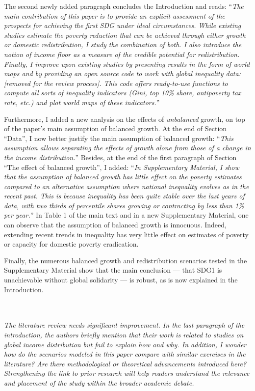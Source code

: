 \documentclass[12pt,english]{article}
\begin{document}
The second newly added paragraph concludes the Introduction and reads: ``\textit{The main contribution of this paper is to provide an explicit assessment of the prospects for achieving the first SDG under ideal circumstances. While existing studies estimate the poverty reduction that can be achieved through either growth or domestic redistribution, I study the combination of both. I also introduce the notion of \textit{income floor} as a measure of the credible potential for redistribution. Finally, I improve upon existing studies by presenting results in the form of world maps and by providing an open source code to work with global inequality data: [\textit{removed for the review process}]. This code offers ready-to-use functions to compute all sorts of inequality indicators (Gini, top 10\% share, antipoverty tax rate, etc.) and plot world maps of these indicators.}''

Furthermore, I added a new analysis on the effects of \textit{unbalanced} growth, on top of the paper's main assumption of balanced growth. At the end of Section ``Data'', I now better justify the main assumption of balanced growth: ``\textit{This assumption allows separating the effects of growth alone from those of a change in the income distribution.}'' Besides, at the end of the first paragraph of Section ``The effect of balanced growth'', I added: 
``\textit{In Supplementary Material, I show that the assumption of balanced growth has little effect on the poverty estimates compared to an alternative assumption where national inequality evolves as in the recent past. This is because inequality has been quite stable over the last years of data, with two thirds of percentile shares growing or contracting by less than 1\% per year.}'' In Table 1 of the main text and in a new Supplementary Material, one can observe that the assumption of balanced growth is innocuous. Indeed, extending recent trends in inequality has very little effect on estimates of poverty or capacity for domestic poverty eradication. 

Finally, the numerous balanced growth and redistribution scenarios tested in the Supplementary Material show that the main conclusion --- that SDG1 is unachievable without global solidarity --- is robust, as is now explained in the Introduction.

~\\ ~\\

\textit{The literature review needs significant improvement. In the last paragraph of the introduction, the authors briefly mention that their work is related to studies on global income distribution but fail to explain how and why. In addition, I wonder how do the scenarios modeled in this paper compare with similar exercises in the literature? Are there methodological or theoretical advancements introduced here? Strengthening the link to prior research will help readers understand the relevance and placement of the study within the broader academic debate. }~\\
\end{document}
